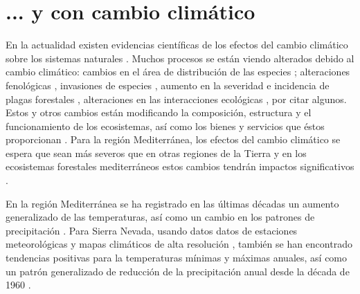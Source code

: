 \section{... y con cambio climático}\label{sec:intro:climate-change}

En la actualidad existen evidencias científicas de los efectos del cambio climático sobre los sistemas naturales \autocites{IPCC2013ClimateChange}. Muchos procesos se están viendo alterados debido al cambio climático: cambios en el área de distribución de las especies \autocites{Thuilleretal2005ClimateChange}; alteraciones fenológicas \autocites{GordoSanz2005PhenologyClimate, EstiartePenuelas2015AlterationPhenology}, invasiones de especies \autocite{GonzalezMorenoetal2014PlantInvasions}, aumento en la severidad e incidencia de plagas forestales \autocites{Hodaretal2012CambioClimatico,HodarZamora2004HerbivoryClimatic}, alteraciones en las interacciones ecológicas \autocites{MontoyaRaffaelli2010ClimateChange}, por citar algunos. Estos y otros cambios están modificando la composición, estructura y el funcionamiento de los ecosistemas, así como los bienes y servicios que éstos proporcionan \autocites{Dingetal2016ValuingClimate}. Para la región Mediterránea, los efectos del cambio climático se espera que sean más severos que en otras regiones de la Tierra \autocites{Giorgi2006ClimateChange,IPCC2013ClimateChange} y en los ecosistemas forestales mediterráneos estos cambios tendrán impactos significativos \autocites{Regato2008AdaptingGlobal,RescodeDiosetal2006ClimateChange,Penuelasetal2017ImpactsGlobal,HerreroZavala2015BosquesBiodiversidad}.  

En la región Mediterránea se ha registrado en las últimas décadas un aumento generalizado de las temperaturas, así como un cambio en los patrones de precipitación \autocites{PerezBoscolo2010ClimateSpain,GiorgiLionello2008ClimateChange,Crameretal2020ClimateEnvironmental}. Para Sierra Nevada, usando datos datos de estaciones meteorológicas y mapas climáticos de alta resolución \autocites{Benitoetal2012SimulacionesClimaticas}, también se han encontrado tendencias positivas para la temperaturas mínimas y máximas anuales, así como un patrón generalizado de reducción de la precipitación anual desde la década de 1960 \autocites{PerezLuqueetal2016SenalesCambio,PerezLuqueetal2021ClimaNevadaBase}.  

